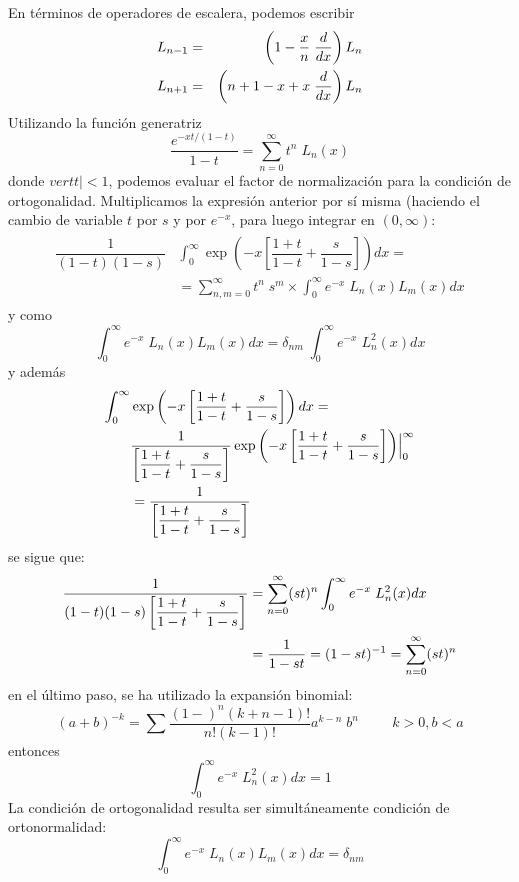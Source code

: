 En términos de operadores de escalera, podemos escribir
\begin{eqnarray*}
L_{n - 1} &=& \left( 1 - \dfrac{x}{n} \; \dfrac{d}{d x} \right) L_{n} \nonumber \\
L_{n + 1} &=& \left( n + 1 - x + x \; \dfrac{d}{d x} \right) L_{n}
\end{eqnarray*}
Utilizando la función generatriz
\[ \dfrac{e^{-x t/(1 - t)}}{1 - t} = \sum_{n=0}^{\infty} t^{n} \; L_{n}(x) \]
donde $vert t \vert < 1$, podemos evaluar el factor de normalización para la condición de ortogonalidad. Multiplicamos la expresión anterior por sí misma (haciendo el cambio de variable $t$ por $s$ y por $e^{-x}$, para luego integrar en $(0, \infty)$:
\begin{eqnarray}
\begin{aligned}
\dfrac{1}{(1 - t)(1 - s)} &\int_{0}^{\infty} \exp \left( -x \left[ \dfrac{1+t}{1-t} + \dfrac{s}{1-s} \right] \right) dx =  \\
&= \sum_{n, m = 0}^{\infty} t^{n} \; s^{m} \times \int_{0}^{\infty} e^{-x} \; L_{n}(x) L_{m}(x) dx
\end{aligned}
\end{eqnarray}
y como
\[ \int_{0}^{\infty} e^{-x} \; L_{n}(x) L_{m}(x) dx = \delta_{nm} \; \int_{0}^{\infty} e^{-x} \; L_{n}^{2} (x) dx \]
y además
\begin{eqnarray*}
\int_{0}^{\infty} &\exp \left( -x \left[ \dfrac{1 + t}{1 - t} + \dfrac{s}{1 - s} \right] \right) dx = \nonumber \\
&\dfrac{1}{\left[ \dfrac{1 + t}{1 - t} + \dfrac{s}{1 - s} \right]} \exp \left( -x \left[ \dfrac{1 + t}{1 - t} + \dfrac{s}{1 - s} \right] \right) \Bigr|_{0}^{\infty} \nonumber \\
&= \dfrac{1}{\left[ \dfrac{1 + t}{1 - t} + \dfrac{s}{1 - s} \right]}
\end{eqnarray*}
se sigue que:
\begin{eqnarray*}
\dfrac{1}{(1-t)(1 - s) \left[ \dfrac{1 + t}{1 - t} + \dfrac{s}{1 - s} \right]} &= \sum_{n=0}^{\infty} (s t)^{n} \int_{0}^{\infty} e^{-x} \; L_{n}^{2} (x)  dx \nonumber \\
&= \dfrac{1}{1 - st} = (1 - st)^{-1} = \sum_{n=0}^{\infty} (s t)^{n}
\end{eqnarray*}
en el último paso, se ha utilizado la expansión binomial:
\[  (a + b)^{-k} = \sum \dfrac{(1-)^{n} (k + n - 1)!}{n! (k -1)!} a^{k - n} \; b^{n} \hspace{1cm} k >0, b < a \]
entonces
\[ \int_{0}^{\infty} e^{-x} \; L_{n}^{2}(x) dx = 1 \]
La condición de ortogonalidad resulta ser simultáneamente condición de ortonormalidad:
\begin{equation}
\boxed{\int_{0}^{\infty} e^{-x} \; L_{n}(x) L_{m}(x) d x = \delta_{nm} }
\label{eq:ecuacion_08_78}
\end{equation}







